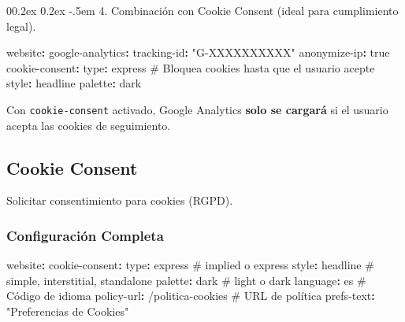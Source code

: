 \documentclass[
  doc,
  floatsintext,
  longtable,
  a4paper,
  nolmodern,
  notxfonts,
  notimes,
  12pt,
  colorlinks=true,linkcolor=blue,citecolor=blue,urlcolor=blue]{apa7}
\makeatletter
\renewcommand{\paragraph}{\@startsection{paragraph}{4}{\parindent}%
	{0\baselineskip \@plus 0.2ex \@minus 0.2ex}%
	{-.5em}%
	{\normalfont\normalsize\bfseries\typesectitle}}
\newenvironment{Shaded}{\begin{snugshade}}{\end{snugshade}}
\newcommand{\AttributeTok}[1]{\textcolor[rgb]{0.40,0.45,0.13}{#1}}
\newcommand{\CharTok}[1]{\textcolor[rgb]{0.13,0.47,0.30}{#1}}
\newcommand{\CommentTok}[1]{\textcolor[rgb]{0.37,0.37,0.37}{#1}}
\newcommand{\FunctionTok}[1]{\textcolor[rgb]{0.28,0.35,0.67}{#1}}
\newcommand{\KeywordTok}[1]{\textcolor[rgb]{0.00,0.23,0.31}{\textbf{#1}}}
\newcommand{\StringTok}[1]{\textcolor[rgb]{0.13,0.47,0.30}{#1}}
\makeatother
\begin{document}
\paragraph{4. Combinación con Cookie Consent (ideal para cumplimiento
legal).}\label{combinaciuxf3n-con-cookie-consent-ideal-para-cumplimiento-legal}

\begin{Shaded}
\begin{Highlighting}[]
\FunctionTok{website}\KeywordTok{:}
\AttributeTok{  }\FunctionTok{google{-}analytics}\KeywordTok{:}
\AttributeTok{    }\FunctionTok{tracking{-}id}\KeywordTok{:}\AttributeTok{ }\StringTok{"G{-}XXXXXXXXXX"}
\AttributeTok{    }\FunctionTok{anonymize{-}ip}\KeywordTok{:}\AttributeTok{ }\CharTok{true}
\AttributeTok{  }
\AttributeTok{  }\FunctionTok{cookie{-}consent}\KeywordTok{:}
\AttributeTok{    }\FunctionTok{type}\KeywordTok{:}\AttributeTok{ express}\CommentTok{                     \# Bloquea cookies hasta que el usuario acepte}
\AttributeTok{    }\FunctionTok{style}\KeywordTok{:}\AttributeTok{ headline}
\AttributeTok{    }\FunctionTok{palette}\KeywordTok{:}\AttributeTok{ dark}
\end{Highlighting}
\end{Shaded}

Con \texttt{cookie-consent} activado, Google Analytics \textbf{solo se
cargará} si el usuario acepta las cookies de seguimiento.

\subsection{Cookie Consent}\label{cookie-consent}

Solicitar consentimiento para cookies (RGPD).

\subsubsection{Configuración
Completa}\label{configuraciuxf3n-completa-4}

\begin{Shaded}
\begin{Highlighting}[]
\FunctionTok{website}\KeywordTok{:}
\AttributeTok{  }\FunctionTok{cookie{-}consent}\KeywordTok{:}
\AttributeTok{    }\FunctionTok{type}\KeywordTok{:}\AttributeTok{ express}\CommentTok{                    \# implied o express}
\AttributeTok{    }\FunctionTok{style}\KeywordTok{:}\AttributeTok{ headline}\CommentTok{                  \# simple, interstitial, standalone}
\AttributeTok{    }\FunctionTok{palette}\KeywordTok{:}\AttributeTok{ dark}\CommentTok{                    \# light o dark}
\AttributeTok{    }\FunctionTok{language}\KeywordTok{:}\AttributeTok{ es}\CommentTok{                     \# Código de idioma}
\AttributeTok{    }\FunctionTok{policy{-}url}\KeywordTok{:}\AttributeTok{ /politica{-}cookies}\CommentTok{    \# URL de política}
\AttributeTok{    }\FunctionTok{prefs{-}text}\KeywordTok{:}\AttributeTok{ }\StringTok{"Preferencias de Cookies"}
\end{Highlighting}
\end{Shaded}
\end{document}
